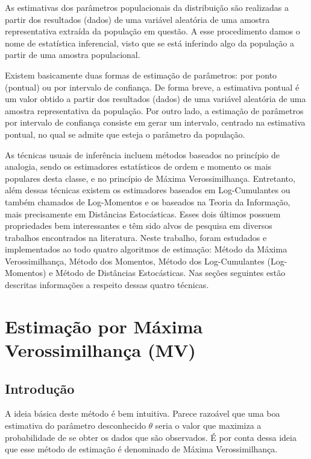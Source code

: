 As estimativas dos parâmetros populacionais da distribuição são realizadas a partir dos resultados (dados) de uma variável aleatória de uma amostra representativa extraída da população em questão. A esse procedimento damos o nome de estatística inferencial, visto que se está inferindo algo da população a partir de uma amostra populacional.

Existem basicamente duas formas de estimação de parâmetros: por ponto (pontual) ou por intervalo de confiança. De forma breve, a estimativa pontual é um valor obtido a partir dos resultados (dados) de uma variável aleatória de uma amostra representativa da população. Por outro lado, a estimação de parâmetros por intervalo de confiança consiste em gerar um intervalo, centrado na estimativa pontual, no qual se admite que esteja o parâmetro da população.

As técnicas usuais de inferência incluem métodos baseados no princípio de analogia, sendo os estimadores estatísticos de ordem e momento os mais populares desta classe, e no princípio de Máxima Verossimilhança. Entretanto, além dessas técnicas existem os estimadores baseados em Log-Cumulantes ou também chamados de Log-Momentos e os baseados na Teoria da Informação, mais precisamente em Distâncias Estocásticas. Esses dois últimos possuem propriedades bem interessantes e têm sido alvos de pesquisa em diversos trabalhos encontrados na literatura. Neste trabalho, foram estudados e implementados ao todo quatro algoritmos de estimação: Método da Máxima Verossimilhança, Método dos Momentos, Método dos Log-Cumulantes (Log-Momentos) e Método de Distâncias Estocásticas. Nas seções seguintes estão descritas informações a respeito dessas quatro técnicas.

\section{Estimação por Máxima Verossimilhança (MV)}

\subsection{Introdução}

A ideia básica deste método é bem intuitiva. Parece razoável que uma boa estimativa do parâmetro desconhecido \begin{math} \theta \end{math} seria o valor que maximiza a probabilidade de se obter os dados que são observados. É por conta dessa ideia que esse método de estimação é denominado de Máxima Verossimilhança. 
 
